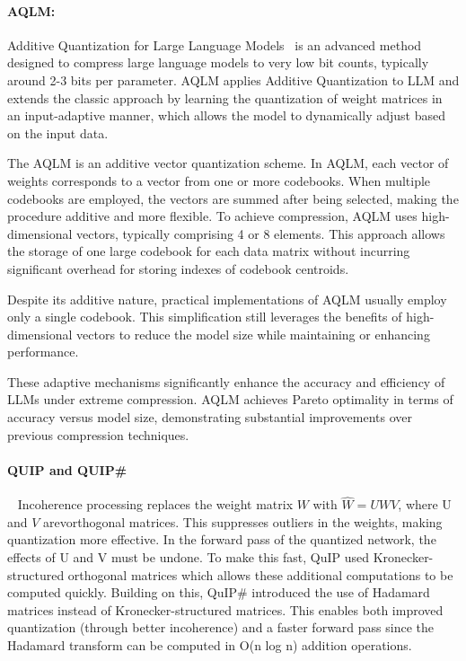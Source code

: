 \paragraph{AQLM:} Additive Quantization for Large Language Models~\cite{egiazarian2024extreme} is an advanced method designed to compress large language models to very low bit counts, typically around 2-3 bits per parameter. AQLM applies Additive Quantization to LLM and extends the classic approach by learning the quantization of weight matrices in an input-adaptive manner, which allows the model to dynamically adjust based on the input data. 

The AQLM is an additive vector quantization scheme. In AQLM, each vector of weights corresponds to a vector from one or more codebooks. When multiple codebooks are employed, the vectors are summed after being selected, making the procedure additive and more flexible. To achieve compression, AQLM uses high-dimensional vectors, typically comprising 4 or 8 elements. This approach allows the storage of one large codebook for each data matrix without incurring significant overhead for storing indexes of codebook centroids. 

Despite its additive nature, practical implementations of AQLM usually employ only a single codebook. This simplification still leverages the benefits of high-dimensional vectors to reduce the model size while maintaining or enhancing performance.

These adaptive mechanisms significantly enhance the accuracy and efficiency of LLMs under extreme compression. AQLM achieves Pareto optimality in terms of accuracy versus model size, demonstrating substantial improvements over previous compression techniques. 

\paragraph{QUIP and QUIP\#}~\cite{chee2024quip} Incoherence processing replaces the weight matrix $W$ with  $\hat{W} = UWV$, where U and $V$ arevorthogonal matrices. This suppresses outliers in the weights, making quantization more effective. In the forward pass of the quantized network, the effects of U and V must be undone. To make this fast, QuIP used Kronecker-structured orthogonal matrices which allows these additional computations to be computed quickly. Building on this, QuIP\# introduced the use of Hadamard matrices instead of Kronecker-structured matrices. This enables both improved quantization (through better incoherence) and a faster forward pass since the Hadamard transform can be computed in O(n log n) addition
operations.


